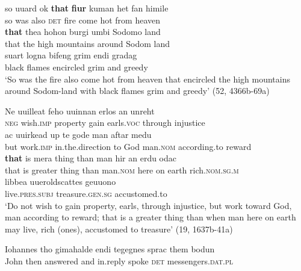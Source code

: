 \ea%
    \label{ex:4:9}
\ea
\gll so  uuard  ok   \textbf{that}  \textbf{fiur}   kuman  het   fan      himile\\
  so  was    also   \textsc{det}     fire    come  hot  from  heaven\\

\gll \textbf{that}   thea   hohon   burgi     umbi  Sodomo    land\\
that   the    high  mountains  around  Sodom    land\\

\gll suart  logna   bifeng     grim   endi    gradag\\
black   flames  encircled  grim  and    greedy\\

\glt ‘So was the fire also come hot from heaven that encircled the high mountains around Sodom-land with black flames grim and greedy’ (52, 4366b-69a)

\ex
\gll Ne   uuilleat     feho     uuinnan   erlos     an      unreht\\
\textsc{neg}   wish.\textsc{imp}  property    gain     earls.\textsc{voc}  through   injustice\\

\gll ac   uuirkead   up         te gode   man     aftar      medu\\
but  work.\textsc{imp}  in.the.direction  to God  man.\textsc{nom}  according.to   reward\\

\gll \textbf{that}  is   mera  thing  than  man     hir     an  erdu  odac\\
that   is  greater   thing  than  man.\textsc{nom}  here    on  earth  rich.\textsc{nom.sg.m}\\

\gll libbea       uueroldscattes  geuuono\\
live.\textsc{pres.subj}  treasure.\textsc{gen.sg}  accustomed.to\\

\glt ‘Do not wish to gain property, earls, through injustice, but work toward God, man according to reward; that is a greater thing than when man here on earth may live, rich (ones), accustomed to treasure’ (19, 1637b-41a)

\ex
\gll Iohannes  tho     gimahalde   endi    tegegnes   sprac   them   bodun\\
  John      then  answered  and    in.reply   spoke  \textsc{det}     messengers.\textsc{dat.pl}\\

